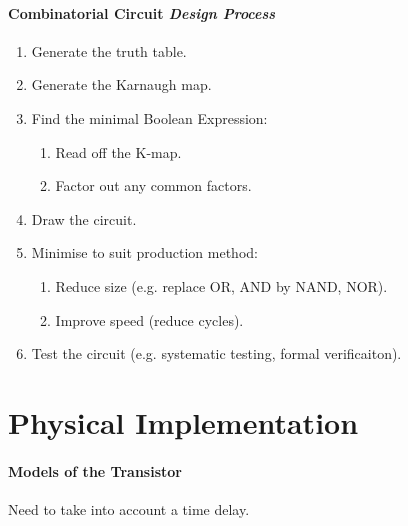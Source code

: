 \documentclass[twocolumn,english]{article}
\begin{document}
\paragraph{Combinatorial Circuit \emph{Design Process}}
\begin{enumerate}
\item Generate the truth table.
\item Generate the Karnaugh map.
\item Find the minimal Boolean Expression:

\begin{enumerate}
\item Read off the K-map.
\item Factor out any common factors.
\end{enumerate}
\item Draw the circuit.
\item Minimise to suit production method:

\begin{enumerate}
\item Reduce size (e.g. replace OR, AND by NAND, NOR).
\item Improve speed (reduce cycles).
\end{enumerate}
\item Test the circuit (e.g. systematic testing, formal verificaiton).
\end{enumerate}

\section{Physical Implementation}


\paragraph{Models of the Transistor}

Need to take into account a time delay.
\end{document}
